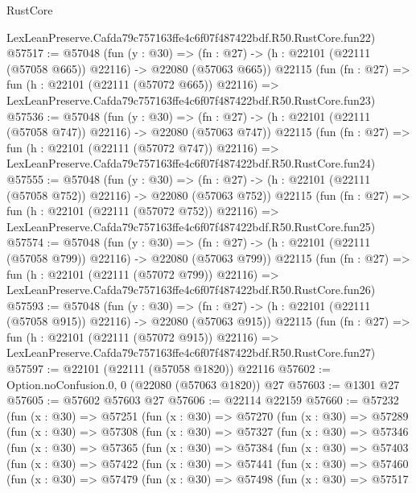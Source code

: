 \begin{lexlean}{RustCore}
\begin{coremodule}
    LexLeanPreserve.Cafda79c757163ffe4c6f07f487422bdf.R50.RustCore.fun22)
@57517 := @57048
    (fun (y : @30) =>
    (fn : @27) -> (h : @22101 (@22111 (@57058 @665)) @22116) -> @22080 (@57063 @665))
    @22115
    (fun (fn : @27) =>
    fun (h : @22101 (@22111 (@57072 @665)) @22116) =>
    LexLeanPreserve.Cafda79c757163ffe4c6f07f487422bdf.R50.RustCore.fun23)
@57536 := @57048
    (fun (y : @30) =>
    (fn : @27) -> (h : @22101 (@22111 (@57058 @747)) @22116) -> @22080 (@57063 @747))
    @22115
    (fun (fn : @27) =>
    fun (h : @22101 (@22111 (@57072 @747)) @22116) =>
    LexLeanPreserve.Cafda79c757163ffe4c6f07f487422bdf.R50.RustCore.fun24)
@57555 := @57048
    (fun (y : @30) =>
    (fn : @27) -> (h : @22101 (@22111 (@57058 @752)) @22116) -> @22080 (@57063 @752))
    @22115
    (fun (fn : @27) =>
    fun (h : @22101 (@22111 (@57072 @752)) @22116) =>
    LexLeanPreserve.Cafda79c757163ffe4c6f07f487422bdf.R50.RustCore.fun25)
@57574 := @57048
    (fun (y : @30) =>
    (fn : @27) -> (h : @22101 (@22111 (@57058 @799)) @22116) -> @22080 (@57063 @799))
    @22115
    (fun (fn : @27) =>
    fun (h : @22101 (@22111 (@57072 @799)) @22116) =>
    LexLeanPreserve.Cafda79c757163ffe4c6f07f487422bdf.R50.RustCore.fun26)
@57593 := @57048
    (fun (y : @30) =>
    (fn : @27) -> (h : @22101 (@22111 (@57058 @915)) @22116) -> @22080 (@57063 @915))
    @22115
    (fun (fn : @27) =>
    fun (h : @22101 (@22111 (@57072 @915)) @22116) =>
    LexLeanPreserve.Cafda79c757163ffe4c6f07f487422bdf.R50.RustCore.fun27)
@57597 := @22101 (@22111 (@57058 @1820)) @22116
@57602 := Option.noConfusion.{0, 0} (@22080 (@57063 @1820)) @27
@57603 := @1301 @27
@57605 := @57602 @57603 @27
@57606 := @22114 @22159
@57660 := @57232
    (fun (x : @30) =>
    @57251
      (fun (x : @30) =>
      @57270
        (fun (x : @30) =>
        @57289
          (fun (x : @30) =>
          @57308
            (fun (x : @30) =>
            @57327
              (fun (x : @30) =>
              @57346
                (fun (x : @30) =>
                @57365
                  (fun (x : @30) =>
                  @57384
                    (fun (x : @30) =>
                    @57403
                      (fun (x : @30) =>
                      @57422
                        (fun (x : @30) =>
                        @57441
                          (fun (x : @30) =>
                          @57460
                            (fun (x : @30) =>
                            @57479
                              (fun (x : @30) =>
                              @57498
                                (fun (x : @30) =>
                                @57517

\end{coremodule}
\end{lexlean}
